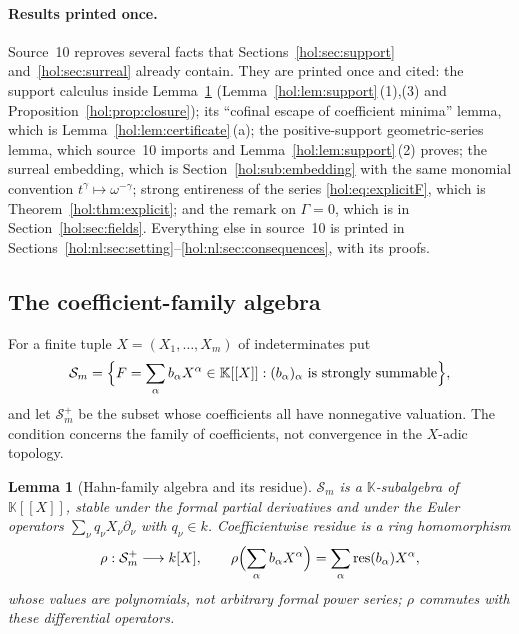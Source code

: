 \documentclass[11pt]{article}
\numberwithin{equation}{section}
\newtheorem{lemma}[theorem]{Lemma}
\theoremstyle{definition}
\theoremstyle{remark}
\newcommand{\res}{\operatorname{res}}
\newcommand{\KK}{\mathbb K}
\newcommand{\Sfam}{\mathcal S}
\begin{document}
\paragraph{Results printed once.}
Source~10 reproves several facts that Sections~\ref{hol:sec:support}
and~\ref{hol:sec:surreal} already contain. They are printed once and cited:
the support calculus inside Lemma~\ref{hol:nl:lem:algebra}
(Lemma~\ref{hol:lem:support}\,(1),(3) and Proposition~\ref{hol:prop:closure});
its ``cofinal escape of coefficient minima'' lemma, which is
Lemma~\ref{hol:lem:certificate}\,(a); the positive-support geometric-series
lemma, which source~10 imports and Lemma~\ref{hol:lem:support}\,(2) proves;
the surreal embedding, which is Section~\ref{hol:sub:embedding} with the same
monomial convention $t^\gamma\mapsto\omega^{-\gamma}$; strong entireness of
the series \eqref{hol:eq:explicitF}, which is Theorem~\ref{hol:thm:explicit};
and the remark on $\Gamma=0$, which is in Section~\ref{hol:sec:fields}.
Everything else in source~10 is printed in
Sections~\ref{hol:nl:sec:setting}--\ref{hol:nl:sec:consequences}, with its
proofs.

\subsection{The coefficient-family algebra}\label{hol:nl:sub:algebra}

For a finite tuple $X=(X_1,\ldots,X_m)$ of indeterminates put
\[
 \Sfam_m=\Bigl\{F=\sum_\alpha b_\alpha X^\alpha\in\KK[[X]]:
 (b_\alpha)_\alpha\text{ is strongly summable}\Bigr\},
\]
and let $\Sfam_m^+$ be the subset whose coefficients all have nonnegative
valuation. The condition concerns the family of coefficients, not convergence
in the $X$-adic topology.

\begin{lemma}[Hahn-family algebra and its residue]\label{hol:nl:lem:algebra}
$\Sfam_m$ is a $\KK$-subalgebra of $\KK[[X]]$, stable under the formal partial
derivatives and under the Euler operators $\sum_\nu q_\nu X_\nu\partial_\nu$
with $q_\nu\in k$. Coefficientwise residue is a ring homomorphism
\[
 \rho:\Sfam_m^+\longrightarrow k[X],\qquad
 \rho\Bigl(\sum_\alpha b_\alpha X^\alpha\Bigr)=\sum_\alpha\res(b_\alpha)X^\alpha,
\]
whose values are polynomials, not arbitrary formal power series; $\rho$
commutes with these differential operators.
\end{lemma}
\end{document}
